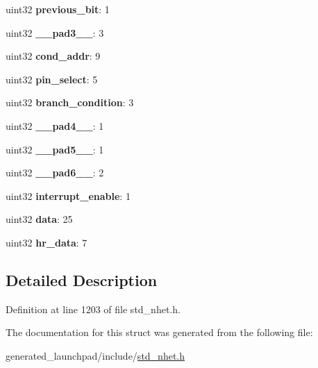 \begin{DoxyCompactItemize}
uint32 {\bfseries previous\+\_\+bit}\+: 1
\item 
\mbox{\label{structbr__format_ab95e6d6e4547cb6a81f9befb8bb0f6eb}} 
uint32 {\bfseries \+\_\+\+\_\+pad3\+\_\+\+\_\+}\+: 3
\item 
\mbox{\label{structbr__format_a3d53801f643ef27848018d40c3b9582a}} 
uint32 {\bfseries cond\+\_\+addr}\+: 9
\item 
\mbox{\label{structbr__format_a76cde7d925581e35744d383eeef98cd1}} 
uint32 {\bfseries pin\+\_\+select}\+: 5
\item 
\mbox{\label{structbr__format_a14bf7e723bd66fa849e12b78ac32e812}} 
uint32 {\bfseries branch\+\_\+condition}\+: 3
\item 
\mbox{\label{structbr__format_a2608ec7e7147fabcfaebcccc2bd02313}} 
uint32 {\bfseries \+\_\+\+\_\+pad4\+\_\+\+\_\+}\+: 1
\item 
\mbox{\label{structbr__format_a1ae8cd0cfec4a3cc6289f3118855d7b0}} 
uint32 {\bfseries \+\_\+\+\_\+pad5\+\_\+\+\_\+}\+: 1
\item 
\mbox{\label{structbr__format_ae62db2c559c5850cf42035124fae2d0f}} 
uint32 {\bfseries \+\_\+\+\_\+pad6\+\_\+\+\_\+}\+: 2
\item 
\mbox{\label{structbr__format_af047c60164a838f333ac7d5a05e7ddc4}} 
uint32 {\bfseries interrupt\+\_\+enable}\+: 1
\item 
\mbox{\label{structbr__format_a044baa2ff7d5486a61b9d78bf465bede}} 
uint32 {\bfseries data}\+: 25
\item 
\mbox{\label{structbr__format_a5f3532f9936a1a3ea777a9117d0bd440}} 
uint32 {\bfseries hr\+\_\+data}\+: 7
\end{DoxyCompactItemize}


\subsection{Detailed Description}


Definition at line 1203 of file std\+\_\+nhet.\+h.



The documentation for this struct was generated from the following file\+:\begin{DoxyCompactItemize}
\item 
generated\+\_\+launchpad/include/\mbox{\hyperlink{std__nhet_8h}{std\+\_\+nhet.\+h}}\end{DoxyCompactItemize}
